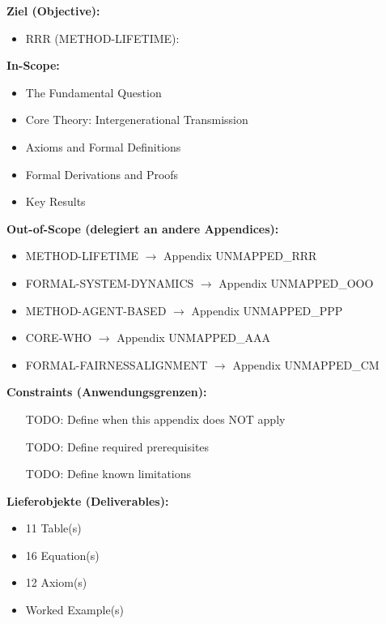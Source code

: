\begin{tcolorbox}[
    colback=orange!5!white,
    colframe=orange!75!black,
    title={\textbf{Appendix Scope: Ziel / In-Scope / Out-of-Scope / Constraints}},
    fonttitle=\bfseries
]

\textbf{Ziel (Objective):}
\begin{itemize}[nosep]
    \item RRR (METHOD-LIFETIME):
\end{itemize}

\textbf{In-Scope:}
\begin{itemize}[nosep]
    \item The Fundamental Question
    \item Core Theory: Intergenerational Transmission
    \item Axioms and Formal Definitions
    \item Formal Derivations and Proofs
    \item Key Results
\end{itemize}

\textbf{Out-of-Scope (delegiert an andere Appendices):}
\begin{itemize}[nosep]
    \item METHOD-LIFETIME $\rightarrow$ Appendix UNMAPPED_RRR
    \item FORMAL-SYSTEM-DYNAMICS $\rightarrow$ Appendix UNMAPPED_OOO
    \item METHOD-AGENT-BASED $\rightarrow$ Appendix UNMAPPED_PPP
    \item CORE-WHO $\rightarrow$ Appendix UNMAPPED_AAA
    \item FORMAL-FAIRNESSALIGNMENT $\rightarrow$ Appendix UNMAPPED_CM
\end{itemize}

\textbf{Constraints (Anwendungsgrenzen):}
\begin{itemize}[nosep]
    \item [TODO: Define when this appendix does NOT apply]
    \item [TODO: Define required prerequisites]
    \item [TODO: Define known limitations]
\end{itemize}

\textbf{Lieferobjekte (Deliverables):}
\begin{itemize}[nosep]
    \item 11 Table(s)
    \item 16 Equation(s)
    \item 12 Axiom(s)
    \item Worked Example(s)
\end{itemize}

\end{tcolorbox}




